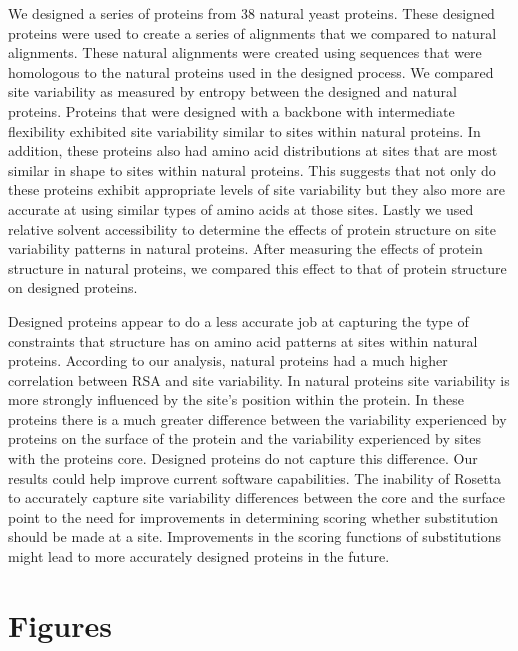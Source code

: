 \documentclass[12pt]{article}
\begin{document}
{\color{blue}
We designed a series of proteins from 38 natural yeast proteins. These designed proteins were used to create a series of alignments that we compared to natural alignments. These natural alignments were created using sequences that were homologous to the natural proteins used in the designed process.  We compared site variability as measured by entropy between the designed and natural proteins. Proteins that were designed with a backbone with intermediate flexibility exhibited site variability similar to sites within natural proteins. In addition, these proteins also had amino acid distributions at sites that are most similar in shape to sites within natural proteins. This suggests that not only do these proteins exhibit appropriate levels of site variability but they also more are accurate at using similar types of amino acids at those sites.  Lastly we used relative solvent accessibility to determine the effects of protein structure on site variability patterns in natural proteins. After measuring the effects of protein structure in natural proteins, we compared this effect to that of protein structure on designed proteins. 

Designed proteins appear to do a less accurate job at capturing the type of constraints that structure has on amino acid patterns at sites within natural proteins. According to our analysis, natural proteins had a much higher correlation between RSA and site variability. In natural proteins site variability is more strongly influenced by the site's position within the protein. In these proteins there is a much greater difference between the variability experienced by proteins on the surface of the protein and the variability experienced by sites with the proteins core. Designed proteins do not capture this difference.  Our results could help improve current software capabilities. The inability of Rosetta to accurately capture site variability differences between the core and the surface point to the need for improvements in determining scoring whether substitution should be made at a site. Improvements in the scoring functions of substitutions might lead to more accurately designed proteins in the future.
}


\cleardoublepage

\section{Figures}
\end{document}
